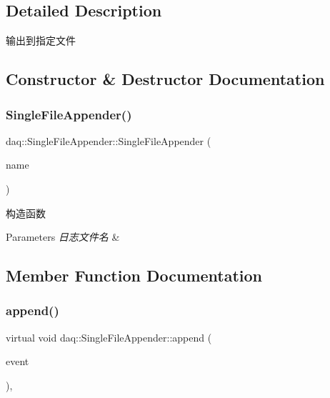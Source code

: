\subsection{Detailed Description}
输出到指定文件 

\subsection{Constructor \& Destructor Documentation}
\mbox{\label{classdaq_1_1SingleFileAppender_a6b44636dd0b021d7d4103d4894d10e0a}} 
\subsubsection{\texorpdfstring{Single\+File\+Appender()}{SingleFileAppender()}}
{\footnotesize\ttfamily daq\+::\+Single\+File\+Appender\+::\+Single\+File\+Appender (\begin{DoxyParamCaption}\item[{const std\+::string \&}]{name }\end{DoxyParamCaption})}



构造函数 


\begin{DoxyParams}{Parameters}
{\em 日志文件名} & \\
\hline
\end{DoxyParams}


\subsection{Member Function Documentation}
\mbox{\label{classdaq_1_1SingleFileAppender_a1cb74c4e11be30c100c614dbc65e94d6}} 
\subsubsection{\texorpdfstring{append()}{append()}}
{\footnotesize\ttfamily virtual void daq\+::\+Single\+File\+Appender\+::append (\begin{DoxyParamCaption}\item[{Log\+Event\+::sptr}]{event }\end{DoxyParamCaption})\hspace{0.3cm}{\ttfamily [override]}, {\ttfamily [virtual]}}



